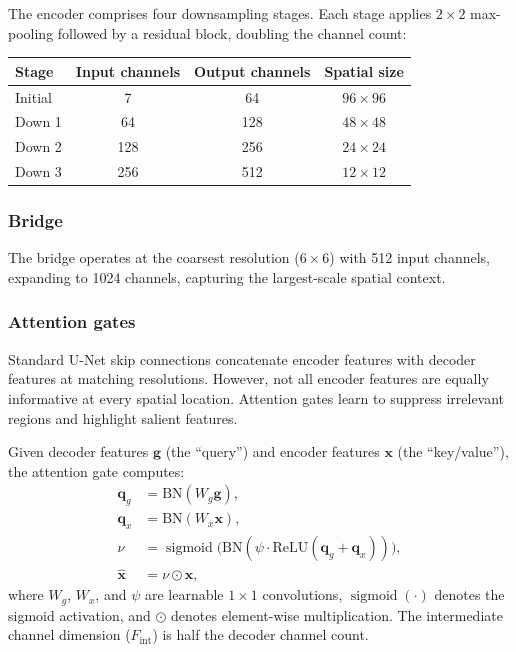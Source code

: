 \documentclass[11pt]{article}
\newcommand{\vect}[1]{\bm{#1}}
\DeclareMathOperator{\sigmoid}{sigmoid}
\begin{document}
The encoder comprises four downsampling stages.  Each stage applies
$2 \times 2$ max-pooling followed by a residual block, doubling
the channel count:

\begin{center}
\begin{tabular}{lccc}
\toprule
Stage & Input channels & Output channels & Spatial size \\
\midrule
Initial & 7 & 64 & $96 \times 96$ \\
Down 1 & 64 & 128 & $48 \times 48$ \\
Down 2 & 128 & 256 & $24 \times 24$ \\
Down 3 & 256 & 512 & $12 \times 12$ \\
\bottomrule
\end{tabular}
\end{center}

\subsubsection{Bridge}
\label{sec:bridge}

The bridge operates at the coarsest resolution ($6 \times 6$) with 512 input channels,
expanding to 1024 channels, capturing the largest-scale spatial context.

\subsubsection{Attention gates}
\label{sec:attention}

Standard U-Net skip connections \citep{ronneberger2015} concatenate
encoder features with decoder features at matching resolutions.
However, not all encoder features are equally informative at every
spatial location.  Attention gates \citep{oktay2018} learn to
suppress irrelevant regions and highlight salient features.

Given decoder features $\vect{g}$ (the ``query'') and encoder
features $\vect{x}$ (the ``key/value''), the attention gate
computes:
\begin{align}
  \vect{q}_g &= \text{BN}(W_g \vect{g}), \label{eq:att_g} \\
  \vect{q}_x &= \text{BN}(W_x \vect{x}), \label{eq:att_x} \\
  \nu &= \sigmoid\!\big(\text{BN}(\psi \cdot \text{ReLU}(
    \vect{q}_g + \vect{q}_x))\big), \label{eq:att_nu} \\
  \hat{\vect{x}} &= \nu \odot \vect{x}, \label{eq:att_out}
\end{align}
where $W_g$, $W_x$, and $\psi$ are learnable $1 \times 1$
convolutions, $\sigmoid(\cdot)$ denotes the sigmoid activation, and $\odot$
denotes element-wise multiplication.  The intermediate channel
dimension ($F_{\text{int}}$) is half the decoder channel count.
\end{document}
